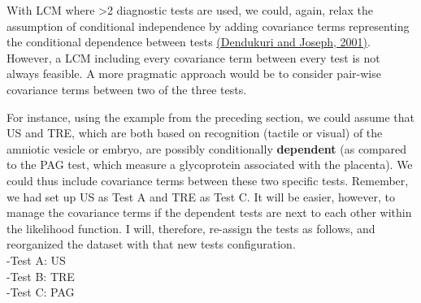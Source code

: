 \documentclass[
]{book}
\begin{document}
With LCM where \textgreater2 diagnostic tests are used, we could, again, relax the assumption of conditional independence by adding covariance terms representing the conditional dependence between tests \href{https://onlinelibrary.wiley.com/doi/10.1111/j.0006-341X.2001.00158.x}{(Dendukuri and Joseph, 2001)}. However, a LCM including every covariance term between every test is not always feasible. A more pragmatic approach would be to consider pair-wise covariance terms between two of the three tests.

For instance, using the example from the preceding section, we could assume that US and TRE, which are both based on recognition (tactile or visual) of the amniotic vesicle or embryo, are possibly conditionally \textbf{dependent} (as compared to the PAG test, which measure a glycoprotein associated with the placenta). We could thus include covariance terms between these two specific tests. Remember, we had set up US as Test A and TRE as Test C. It will be easier, however, to manage the covariance terms if the dependent tests are next to each other within the likelihood function. I will, therefore, re-assign the tests as follows, and reorganized the dataset with that new tests configuration.\\
-Test A: US\\
-Test B: TRE\\
-Test C: PAG
\end{document}
